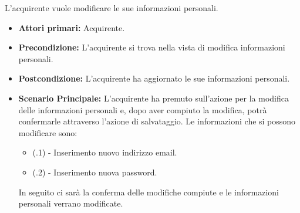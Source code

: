 

L'acquirente vuole modificare le sue informazioni personali.
\begin{itemize}
    \item \textbf{Attori primari:} Acquirente.
    \item \textbf{Precondizione:} L'acquirente si trova nella vista di modifica informazioni personali.
    \item \textbf{Postcondizione:} L'acquirente ha aggiornato le sue informazioni personali.
    \item \textbf{Scenario Principale:} L'acquirente ha premuto sull'azione per la modifica delle informazioni personali e, dopo aver compiuto la modifica, potrà confermarle attraverso l'azione di salvataggio. Le informazioni che si possono modificare sono:
    \begin{itemize}
        \item (\actualUC.1) - Inserimento nuovo indirizzo email.
        \item (\actualUC.2) - Inserimento nuova password.
    \end{itemize}
    In seguito ci sarà la conferma delle modifiche compiute e le informazioni personali verrano modificate.
\end{itemize}

\resetSubUC


